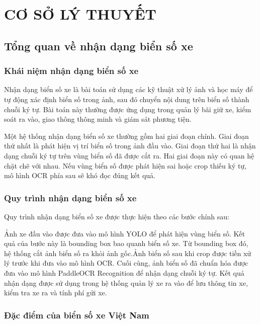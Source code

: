 \documentclass[13pt,a4paper]{report}
\begin{document}
\chapter{CƠ SỞ LÝ THUYẾT}

\section{Tổng quan về nhận dạng biển số xe}

\subsection{Khái niệm nhận dạng biển số xe}

Nhận dạng biển số xe là bài toán sử dụng các kỹ thuật xử lý ảnh và học máy để tự động xác định biển số trong ảnh, sau đó chuyển nội dung trên biển số thành chuỗi ký tự. Bài toán này thường được ứng dụng trong quản lý bãi giữ xe, kiểm soát ra vào, giao thông thông minh và giám sát phương tiện.

Một hệ thống nhận dạng biển số xe thường gồm hai giai đoạn chính. Giai đoạn thứ nhất là phát hiện vị trí biển số trong ảnh đầu vào. Giai đoạn thứ hai là nhận dạng chuỗi ký tự trên vùng biển số đã được cắt ra. Hai giai đoạn này có quan hệ chặt chẽ với nhau. Nếu vùng biển số được phát hiện sai hoặc crop thiếu ký tự, mô hình OCR phía sau sẽ khó đọc đúng kết quả.

\subsection{Quy trình nhận dạng biển số xe}

Quy trình nhận dạng biển số xe được thực hiện theo các bước chính sau:

Ảnh xe đầu vào được đưa vào mô hình YOLO để phát hiện vùng biển số. Kết quả của bước này là bounding box bao quanh biển số xe. Từ bounding box đó, hệ thống cắt ảnh biển số ra khỏi ảnh gốc.Ảnh biển số sau khi crop được tiền xử lý trước khi đưa vào mô hình OCR.
Cuối cùng, ảnh biển số đã chuẩn hóa được đưa vào mô hình PaddleOCR Recognition để nhận dạng chuỗi ký tự. Kết quả nhận dạng được sử dụng trong hệ thống quản lý xe ra vào để lưu thông tin xe, kiểm tra xe ra và tính phí gửi xe.

\subsection{Đặc điểm của biển số xe Việt Nam}
\end{document}
